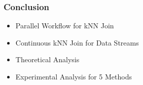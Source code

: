 \begin{frame}
\frametitle{Conclusion}
\begin{itemize}

\item Parallel Workflow for kNN Join

\item Continuous kNN Join for Data Streams

\item Theoretical Analysis

\item Experimental Analysis for 5 Methods

\end{itemize}

\end{frame}


\begin{comment}
\begin{frame}
\frametitle{Conclusion}
\vspace{-0.2in}
\begin{table}
 	\begin{center}\renewcommand{\arraystretch}{1.2}
 	\resizebox{\textwidth}{!}{
 		\begin{tabular}{|c|c|c|c|}
 			\hline
 			\textbf{Algorithm}  & \textbf{Advantage}  &  \textbf{Shortcoming}   & \textbf{Typical Usecase} \\
 			 \hline
 			\textbf{H-BkNNJ} 	& 
 				\begin{tabular}[c]{@{}c@{}}
 					Trivial to implement  
 				\end{tabular} & 
 				\begin{tabular}[c]{@{}c@{}}
 					1. Breaks very quickly \\ 
 					2. Optimal parallelism difficult\\ 
 					to achieve a priori
 				\end{tabular} &
 				\begin{tabular}[c]{@{}c@{}}
 			    	Any tiny and low dimension dataset\\
 			    	($\sim$ 25000 records)
 			    \end{tabular} \\ \hline
 			\textbf{H-BNLJ}     &
 				\begin{tabular}[c]{@{}c@{}}
 				 	Easy to implement
 				\end{tabular} & 
 				\begin{tabular}[c]{@{}c@{}}
 				 	1. Slow\\
 				 	2. Very large communication overhead 

\end{comment}
